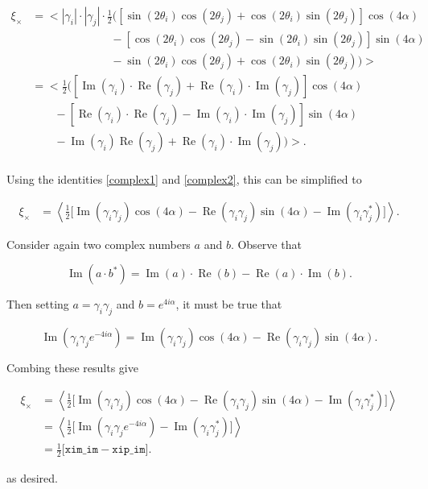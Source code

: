 \documentclass[%
 reprint,
 amsmath,amssymb,
 aps,
]{revtex4-1}
\begin{document}
\begin{align*}
\xi_\times&=\Big<|\gamma_i|\cdot|\gamma_j|\cdot\frac{1}{2}\Big(\left[\sin(2\theta_i)\cos(2\theta_j)+\cos(2\theta_i)\sin(2\theta_j)\right]\cos(4\alpha)\\
&\qquad\qquad\qquad\quad-\left[\cos(2\theta_i)\cos(2\theta_j)-\sin(2\theta_i)\sin(2\theta_j)\right]\sin(4\alpha)\\
&\qquad\qquad\qquad\quad-\sin(2\theta_i)\cos(2\theta_j)+\cos(2\theta_i)\sin(2\theta_j)\Big)\Big>\\
&=\Big<\frac{1}{2}\Big(\left[\operatorname{Im}(\gamma_i)\cdot\operatorname{Re}(\gamma_j)+\operatorname{Re}(\gamma_i)\cdot\operatorname{Im}(\gamma_j)\right]\cos(4\alpha)\\
&\qquad-\left[\operatorname{Re}(\gamma_i)\cdot\operatorname{Re}(\gamma_j)-\operatorname{Im}(\gamma_i)\cdot\operatorname{Im}(\gamma_j)\right]\sin(4\alpha)\\
&\qquad-\operatorname{Im}(\gamma_i)\operatorname{Re}(\gamma_j)+\operatorname{Re}(\gamma_i)\cdot\operatorname{Im}(\gamma_j)\Big)\Big>.\\
\end{align*}

Using the identities \eqref{complex1} and \eqref{complex2}, this can be simplified to

\begin{align*}
\xi_\times&=\left<\frac{1}{2}\big[\operatorname{Im}(\gamma_i\gamma_j)\cos(4\alpha)-\operatorname{Re}(\gamma_i\gamma_j)\sin(4\alpha)-\operatorname{Im}(\gamma_i\gamma_j^*)\big]\right>.
\end{align*}

Consider again two complex numbers $a$ and $b$. Observe that

$$\operatorname{Im}(a\cdot b^*)=\operatorname{Im}(a)\cdot\operatorname{Re}(b)-\operatorname{Re}(a)\cdot\operatorname{Im}(b).$$

Then setting $a=\gamma_i\gamma_j$ and $b=e^{4i\alpha}$, it must be true that

$$\operatorname{Im}\left(\gamma_i\gamma_je^{-4i\alpha}\right)=\operatorname{Im}(\gamma_i\gamma_j)\cos(4\alpha)-\operatorname{Re}(\gamma_i\gamma_j)\sin(4\alpha).$$

Combing these results give

\begin{align*}
\xi_\times&=\left<\frac{1}{2}\big[\operatorname{Im}(\gamma_i\gamma_j)\cos(4\alpha)-\operatorname{Re}(\gamma_i\gamma_j)\sin(4\alpha)-\operatorname{Im}(\gamma_i\gamma_j^*)\big]\right>\\
&=\left<\frac{1}{2}\big[\operatorname{Im}\left(\gamma_i\gamma_je^{-4i\alpha}\right)-\operatorname{Im}(\gamma_i\gamma_j^*)\big]\right>\\
&=\frac{1}{2}\big[\texttt{xim\_im}-\texttt{xip\_im}\big].
\end{align*}

as desired.

\end{document}
